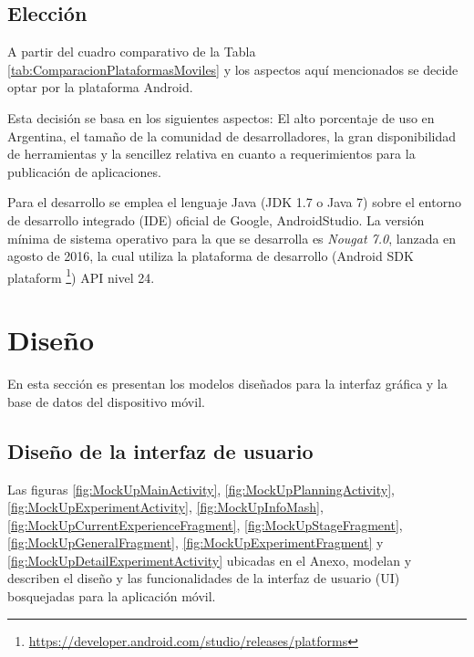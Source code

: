     
    \subsection{Elección}
    \par
    A partir del cuadro comparativo de la Tabla \ref{tab:ComparacionPlataformasMoviles} y los aspectos aquí mencionados se decide optar por la plataforma Android. 
    \par
    Esta decisión se basa en los siguientes aspectos: El alto porcentaje de uso en Argentina, el tamaño de la comunidad de desarrolladores, la gran disponibilidad de herramientas y la sencillez relativa en cuanto a requerimientos para la publicación de aplicaciones.
    
    \par Para el desarrollo se emplea el lenguaje Java (JDK 1.7 o Java 7) sobre el entorno de desarrollo integrado (IDE) oficial de Google, AndroidStudio. La versión mínima de sistema operativo para la que se desarrolla es \textit{Nougat 7.0}, lanzada en agosto de 2016, la cual utiliza la plataforma de desarrollo (Android SDK plataform \footnote{\url{https://developer.android.com/studio/releases/platforms}}) API nivel 24.

    
    
\section{Diseño}
    
    \par En esta sección es presentan los modelos diseñados para la interfaz gráfica y la base de datos del dispositivo móvil.
    
    \subsection{Diseño de la interfaz de usuario}
        \par Las figuras \ref{fig:MockUpMainActivity}, \ref{fig:MockUpPlanningActivity}, \ref{fig:MockUpExperimentActivity}, \ref{fig:MockUpInfoMash}, \ref{fig:MockUpCurrentExperienceFragment}, \ref{fig:MockUpStageFragment}, \ref{fig:MockUpGeneralFragment}, \ref{fig:MockUpExperimentFragment} y \ref{fig:MockUpDetailExperimentActivity} ubicadas en el Anexo, modelan y describen el diseño y las funcionalidades de la interfaz de usuario (UI) bosquejadas para la aplicación móvil.

